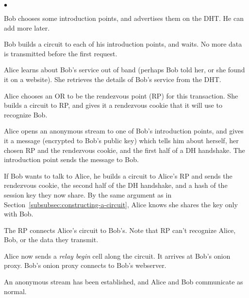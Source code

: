 \documentclass[times,10pt,twocolumn]{article}
\newenvironment{tightlist}{\begin{list}{$\bullet$}{
  \setlength{\itemsep}{0mm}
    \setlength{\parsep}{0mm}
    }}{\end{list}}
\begin{document}
\begin{tightlist}
\item Bob chooses some introduction points, and advertises them on
      the DHT.  He can add more later.
\item Bob builds a circuit to each of his introduction points,
      and waits.  No more data is transmitted before the first request.
\item Alice learns about Bob's service out of band (perhaps Bob told her,
      or she found it on a website). She retrieves the details of Bob's
      service from the DHT.
\item Alice chooses an OR to be the rendezvous point (RP) for this
      transaction. She builds a circuit to RP, and gives it a
      rendezvous cookie that it will use to recognize Bob.
\item Alice opens an anonymous stream to one of Bob's introduction
      points, and gives it a message (encrypted to Bob's public key)
      which tells him 
      about herself, her chosen RP and the rendezvous cookie, and the
      first half of a DH
      handshake. The introduction point sends the message to Bob.
\item If Bob wants to talk to Alice, he builds a circuit to Alice's
      RP and sends the rendezvous cookie, the second half of the DH
      handshake, and a hash of the session
      key they now share. By the same argument as in
      Section~\ref{subsubsec:constructing-a-circuit}, Alice knows she
      shares the key only with Bob.
\item The RP connects Alice's circuit to Bob's. Note that RP can't
      recognize Alice, Bob, or the data they transmit.
\item Alice now sends a \emph{relay begin} cell along the circuit. It
      arrives at Bob's onion proxy. Bob's onion proxy connects to Bob's
      webserver.
\item An anonymous stream has been established, and Alice and Bob
      communicate as normal.
\end{tightlist}
\end{document}
